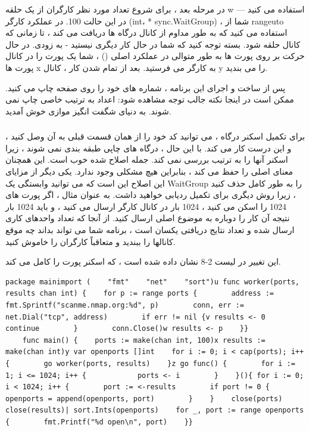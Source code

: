 \documentclass[12pt]{book}
\begin{document}
در مرحله بعد ، برای شروع تعداد مورد نظر کارگران از یک حلقه w استفاده می کنید — در این حالت 100. در عملکرد کارگر (int، * sync.WaitGroup) ، شما از rangeuto استفاده می کنید که به طور مداوم از کانال درگاه ها دریافت می کند ، تا زمانی که کانال حلقه شود. بسته توجه کنید که شما در حال کار دیگری نیستید - به زودی. در حال حرکت بر روی پورت ها به طور متوالی در عملکرد اصلی () ، شما یک پورت را در کانال پورت ها x به کارگر می فرستید. بعد از تمام شدن کار ، کانال y را می بندید.

پس از ساخت و اجرای این برنامه ، شماره های خود را روی صفحه چاپ می کنید. ممکن است در اینجا نکته جالب توجه مشاهده شود: اعداد به ترتیب خاصی چاپ نمی شوند. به دنیای شگفت انگیز موازی خوش آمدید.
\subsubsection{}
برای تکمیل اسکنر درگاه ، می توانید کد خود را از همان قسمت قبلی به آن وصل کنید ، و این درست کار می کند. با این حال ، درگاه های چاپی طبقه بندی نمی شوند ، زیرا اسکنر آنها را به ترتیب بررسی نمی کند. جمله اصلاح شده خوب است. این همچنان معنای اصلی را حفظ می کند ، بنابراین هیچ مشکلی وجود ندارد. یکی دیگر از مزایای این اصلاح این است که می توانید وابستگی یک WaitGroup را به طور کامل حذف کنید ، زیرا روش دیگری برای تکمیل ردیابی خواهید داشت. به عنوان مثال ، اگر پورت های 1024 را اسکن می کنید ، 1024 بار در کانال کارگر ارسال می کنید ، و باید 1024 بار نتیجه آن کار را دوباره به موضوع اصلی ارسال کنید. از آنجا که تعداد واحدهای کاری ارسال شده و تعداد نتایج دریافتی یکسان است ، برنامه شما می تواند بداند چه موقع کانالها را ببندید و متعاقباً کارگران را خاموش کنید.

این تغییر در لیست 2-8 نشان داده شده است ، که اسکنر پورت را کامل می کند.
\begin{latin}
	\begin{lstlisting}[caption={Port scanning with multiple channels (https://github.com/blackhat-go/bhg/ch-2/tcp-scanner-final/main.go/)},captionpos=b]
	package mainimport (    "fmt"    "net"    "sort")u func worker(ports, results chan int) {    for p := range ports {        address := fmt.Sprintf("scanme.nmap.org:%d", p)        conn, err := net.Dial("tcp", address)        if err != nil {v results <- 0            continue        }        conn.Close()w results <- p    }}
	func main() {    ports := make(chan int, 100)x results := make(chan int)y var openports []int    for i := 0; i < cap(ports); i++ {        go worker(ports, results)    }z go func() {        for i := 1; i <= 1024; i++ {            ports <- i        }    }(){ for i := 0; i < 1024; i++ {        port := <-results        if port != 0 {            openports = append(openports, port)        }    }    close(ports)    close(results)| sort.Ints(openports)    for _, port := range openports {        fmt.Printf("%d open\n", port)    }}
	\end{lstlisting}
\end{latin}
\end{document}
